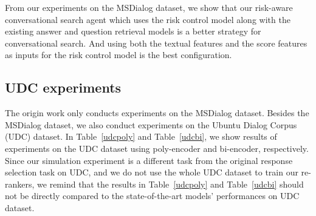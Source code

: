 \documentclass[format=acmsmall, review=False, screen=true]{acmart}
\begin{document}
From our experiments on the MSDialog dataset, we show that our risk-aware conversational search agent which uses the risk control model along with the existing answer and question retrieval models is a better strategy for conversational search. And using both the textual features and the score features as inputs for the risk control model is the best configuration.

\subsection{UDC experiments}
The origin work \cite{wang2021controlling} only conducts experiments on the MSDialog dataset. Besides the MSDialog dataset, we also conduct experiments on the Ubuntu Dialog Corpus (UDC) dataset. In Table~\ref{udcpoly} and Table~\ref{udcbi}, we show results of experiments on the UDC dataset using poly-encoder and bi-encoder, respectively. Since our simulation experiment is a different task from the original response selection task on UDC, and we do not use the whole UDC dataset to train our re-rankers, we remind that the results in Table~\ref{udcpoly} and Table~\ref{udcbi} should not be directly compared to the state-of-the-art models' performances \cite{henderson2019convertonUDC, polyencoder,chen2019sequentialonUDC} on UDC dataset.
\end{document}
